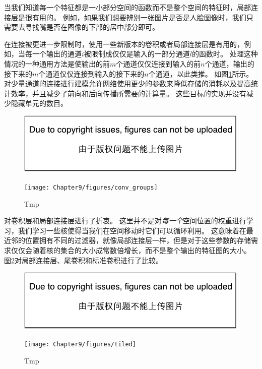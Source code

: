 
当我们知道每一个特征都是一小部分空间的函数而不是整个空间的特征时，局部连接层是很有用的。
例如，如果我们想要辨别一张图片是否是人脸图像时，我们只需要去寻找嘴是否在图像的下部的居中部分即可。

在连接被更进一步限制时，使用一些新版本的卷积或者局部连接层是有用的，例如，当每一个输出的通道$i$被限制成仅仅是输入的一部分通道$l$的函数时。
处理这种情况的一种通用方法是使输出的前$m$个通道仅仅连接到输入的前$n$个通道，输出的接下来的$m$个通道仅仅连接到输入的接下来的$n$个通道，以此类推。
如图\ref{fig:chap9_conv_groups}所示。
对少量通道的连接进行建模允许网络使用更少的参数来降低存储的消耗以及提高统计效率，并且减少了前向和后向传播所需要的计算量。
这些目标的实现并没有减少隐藏单元的数目。
\begin{figure}[!htb]
\ifOpenSource
\centerline{\includegraphics{figure.pdf}}
\else
\centerline{\texttt{[image: Chapter9/figures/conv\_groups]}}
\fi
\caption{Tmp}
\label{fig:chap9_conv_groups}
\end{figure}

\citep{Gregor+LeCun-2010,Le2010}对卷积层和局部连接层进行了折衷。
这里并不是对\emph{每一个}空间位置的权重进行学习，我们学习一些核使得当我们在空间移动时它们可以循环利用。
这意味着在最近邻的位置拥有不同的过滤器，就像局部连接层一样，但是对于这些参数的存储需求仅仅会随着核的集合的大小成常数倍增长，而不是整个输出的特征图的大小。
图\ref{fig:chap9_tiled}对局部连接层、尾卷积和标准卷积进行了比较。
\begin{figure}[!htb]
\ifOpenSource
\centerline{\includegraphics{figure.pdf}}
\else
\centerline{\texttt{[image: Chapter9/figures/tiled]}}
\fi
\caption{Tmp}
\label{fig:chap9_tiled}
\end{figure}
 
